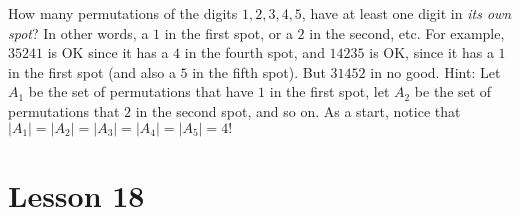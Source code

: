 \documentclass[11pt]{amsart}
\begin{document}
\begin{enumerate}
How many permutations of the digits $1,2,3,4,5$, have at least one digit in {\it its
own spot}? In other words, a $1$ in the first spot, or a $2$ in the second, etc.
For example, $35241$ is OK since it has a $4$ in the fourth spot, and $14235$ is OK, since
it has a $1$ in the first spot (and also a $5$ in the fifth spot). But $31452$ in no good.
Hint: Let $A_1$ be the set of permutations that have $1$ in the first spot, let $A_2$ be
the set of permutations that $2$ in the second spot, and so on. As a start, notice that $|A_{1}|
= |A_{2}| = |A_{3}| = |A_{4}| = |A_{5}| = 4!$ \\[5pt]

\end{enumerate}

\section{Lesson 18}
\end{document}
